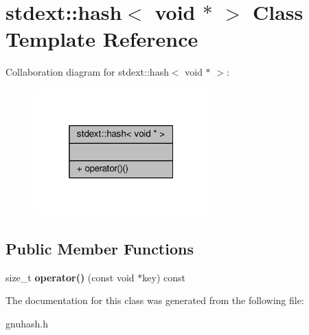 \hypertarget{classstdext_1_1hash_3_01void_01_5_01_4}{}\section{stdext\+:\+:hash$<$ void $\ast$ $>$ Class Template Reference}
\label{classstdext_1_1hash_3_01void_01_5_01_4}


Collaboration diagram for stdext\+:\+:hash$<$ void $\ast$ $>$\+:
\nopagebreak
\begin{figure}[H]
\begin{center}
\leavevmode
\includegraphics[width=193pt]{d2/d2a/classstdext_1_1hash_3_01void_01_5_01_4__coll__graph}
\end{center}
\end{figure}
\subsection*{Public Member Functions}
\begin{DoxyCompactItemize}
\item 
size\+\_\+t {\bfseries operator()} (const void $\ast$key) const \hypertarget{classstdext_1_1hash_3_01void_01_5_01_4_afe48b46e0ed20dcb4f29c8b613169b3a}{}\label{classstdext_1_1hash_3_01void_01_5_01_4_afe48b46e0ed20dcb4f29c8b613169b3a}

\end{DoxyCompactItemize}


The documentation for this class was generated from the following file\+:\begin{DoxyCompactItemize}
\item 
gnuhash.\+h\end{DoxyCompactItemize}

